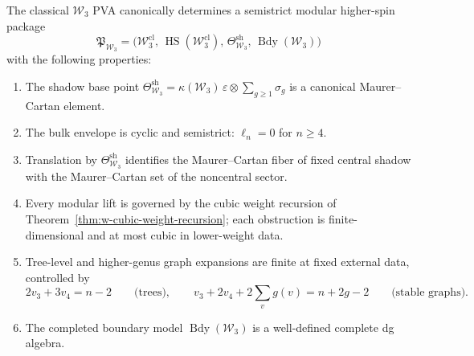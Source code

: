 \begin{theorem}
\label{thm:w-semistrict-package}
The classical $\mathcal{W}_3$ PVA canonically determines a
semistrict modular higher-spin package
\[
\mathfrak{P}_{\mathcal{W}_3}
= \bigl(\mathcal{W}_3^{\mathrm{cl}},\,
         \operatorname{HS}(\mathcal{W}_3^{\mathrm{cl}}),\,
         \Theta_{\mathcal{W}_3}^{\mathrm{sh}},\,
         \operatorname{Bdy}(\mathcal{W}_3)\bigr)
\]
with the following properties:
\begin{enumerate}[label=\textup{(\roman*)}]
\item The shadow base point
$\Theta_{\mathcal{W}_3}^{\mathrm{sh}}
= \kappa(\mathcal{W}_3)\,\varepsilon \otimes \sum_{g \ge 1}\sigma_g$
is a canonical Maurer--Cartan element.

\item The bulk envelope is cyclic and semistrict:
$\ell_n = 0$ for $n \ge 4$.

\item Translation by $\Theta_{\mathcal{W}_3}^{\mathrm{sh}}$
identifies the Maurer--Cartan fiber of fixed central shadow with the
Maurer--Cartan set of the noncentral sector.

\item Every modular lift is governed by the cubic weight recursion
of Theorem~\ref{thm:w-cubic-weight-recursion}; each obstruction is
finite-dimensional and at most cubic in lower-weight data.

\item Tree-level and higher-genus graph expansions are finite at
fixed external data, controlled by
\[
2v_3 + 3v_4 = n - 2
\qquad\text{(trees)},
\qquad
v_3 + 2v_4 + 2\sum_v g(v) = n + 2g - 2
\qquad\text{(stable graphs)}.
\]

\item The completed boundary model
$\operatorname{Bdy}(\mathcal{W}_3)$ is a well-defined complete dg
algebra.
\end{enumerate}
\end{theorem}

